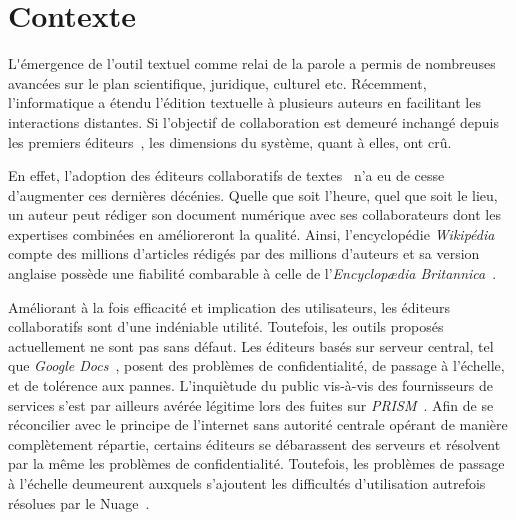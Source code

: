
\section{Contexte}

\lettrine{L}'émergence de l'outil textuel comme relai de la parole a permis de
nombreuses avancées sur le plan scientifique, juridique, culturel
etc. Récemment, l'informatique a étendu l'édition textuelle à plusieurs auteurs
en facilitant les interactions distantes. Si l'objectif de collaboration est
demeuré inchangé depuis les premiers éditeurs~\cite{engelbart1968research}, les
dimensions du système, quant à elles, ont crû.

En effet, l'adoption des éditeurs collaboratifs de
textes~\cite{ellis1991groupware} n'a eu de cesse d'augmenter ces dernières
décénies. Quelle que soit l'heure, quel que soit le lieu, un auteur peut rédiger
son document numérique avec ses collaborateurs dont les expertises combinées en
amélioreront la qualité. Ainsi, l'encyclopédie \emph{Wikipédia} compte des
millions d'articles rédigés par des millions d'auteurs et sa version anglaise
possède une fiabilité combarable à celle de l'\emph{Encyclop\ae{}dia
  Britannica}~\cite{giles2005internet}.

Améliorant à la fois efficacité et implication des utilisateurs, les éditeurs
collaboratifs sont d'une indéniable utilité. Toutefois, les outils proposés
actuellement ne sont pas sans défaut. Les éditeurs basés sur serveur central,
tel que \emph{Google Docs}~\cite{googledocs}, posent des problèmes de
confidentialité, de passage à l'échelle, et de tolérence aux
pannes. L'inquiètude du public vis-à-vis des fournisseurs de services s'est par
ailleurs avérée légitime lors des fuites sur
\emph{PRISM}~\cite{gellman2013us}. Afin de se réconcilier avec le principe de
l'internet sans autorité centrale opérant de manière complètement répartie,
certains éditeurs se débarassent des serveurs et résolvent par la même les
problèmes de confidentialité. Toutefois, les problèmes de passage à l'échelle
deumeurent auxquels s'ajoutent les difficultés d'utilisation autrefois résolues
par le Nuage~\cite{mell2011national}.


